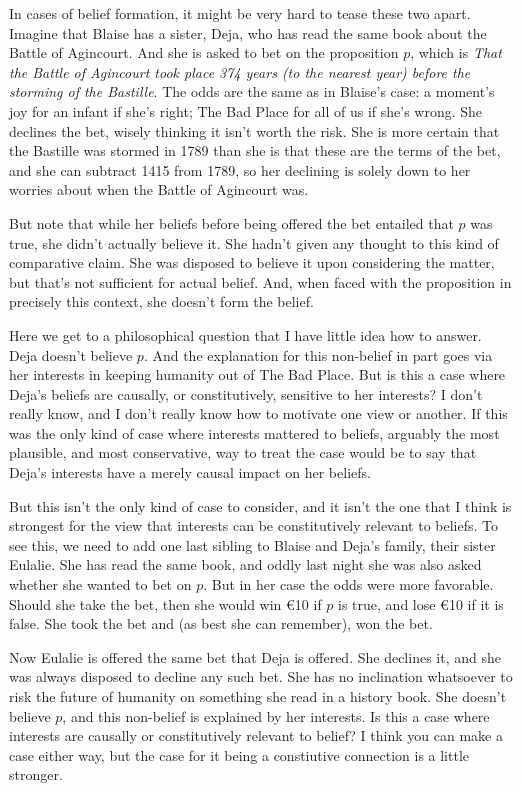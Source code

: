 \documentclass[11pt,]{book}
\begin{document}
In cases of belief formation, it might be very hard to tease these two apart. Imagine that Blaise has a sister, Deja, who has read the same book about the Battle of Agincourt. And she is asked to bet on the proposition \(p\), which is \emph{That the Battle of Agincourt took place 374 years (to the nearest year) before the storming of the Bastille}. The odds are the same as in Blaise's case: a moment's joy for an infant if she's right; The Bad Place for all of us if she's wrong. She declines the bet, wisely thinking it isn't worth the risk. She is more certain that the Bastille was stormed in 1789 than she is that these are the terms of the bet, and she can subtract 1415 from 1789, so her declining is solely down to her worries about when the Battle of Agincourt was.

But note that while her beliefs before being offered the bet entailed that \(p\) was true, she didn't actually believe it. She hadn't given any thought to this kind of comparative claim. She was disposed to believe it upon considering the matter, but that's not sufficient for actual belief. And, when faced with the proposition in precisely this context, she doesn't form the belief.

Here we get to a philosophical question that I have little idea how to answer. Deja doesn't believe \(p\). And the explanation for this non-belief in part goes via her interests in keeping humanity out of The Bad Place. But is this a case where Deja's beliefs are causally, or constitutively, sensitive to her interests? I don't really know, and I don't really know how to motivate one view or another. If this was the only kind of case where interests mattered to beliefs, arguably the most plausible, and most conservative, way to treat the case would be to say that Deja's interests have a merely causal impact on her beliefs.

But this isn't the only kind of case to consider, and it isn't the one that I think is strongest for the view that interests can be constitutively relevant to beliefs. To see this, we need to add one last sibling to Blaise and Deja's family, their sister Eulalie. She has read the same book, and oddly last night she was also asked whether she wanted to bet on \(p\). But in her case the odds were more favorable. Should she take the bet, then she would win €10 if \(p\) is true, and lose €10 if it is false. She took the bet and (as best she can remember), won the bet.

Now Eulalie is offered the same bet that Deja is offered. She declines it, and she was always disposed to decline any such bet. She has no inclination whatsoever to risk the future of humanity on something she read in a history book. She doesn't believe \(p\), and this non-belief is explained by her interests. Is this a case where interests are causally or constitutively relevant to belief? I think you can make a case either way, but the case for it being a constiutive connection is a little stronger.
\end{document}
